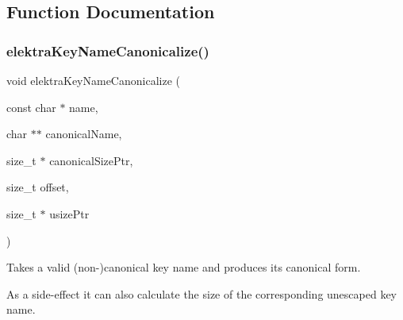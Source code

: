 \subsection{Function Documentation}
\mbox{\label{group__keyname_ga99ef3765a0ea0887c8ab72859ae2592e}} 
\subsubsection{\texorpdfstring{elektra\+Key\+Name\+Canonicalize()}{elektraKeyNameCanonicalize()}}
{\footnotesize\ttfamily void elektra\+Key\+Name\+Canonicalize (\begin{DoxyParamCaption}\item[{const char $\ast$}]{name,  }\item[{char $\ast$$\ast$}]{canonical\+Name,  }\item[{size\+\_\+t $\ast$}]{canonical\+Size\+Ptr,  }\item[{size\+\_\+t}]{offset,  }\item[{size\+\_\+t $\ast$}]{usize\+Ptr }\end{DoxyParamCaption})}



Takes a valid (non-\/)canonical key name and produces its canonical form. 

As a side-\/effect it can also calculate the size of the corresponding unescaped key name.


